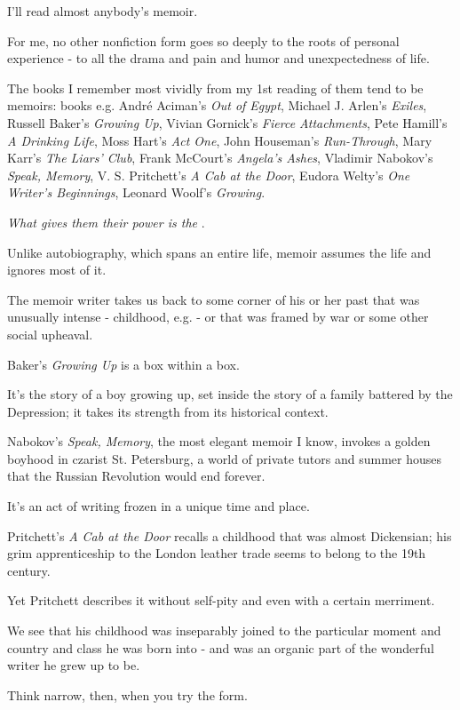 \documentclass{book}
\numberwithin{equation}{section}
\begin{document}
I'll read almost anybody's memoir.

For me, no other nonfiction form goes so deeply to the roots of personal experience - to all the drama and pain and humor and unexpectedness of life.

The books I remember most vividly from my 1st reading of them tend to be memoirs: books e.g. Andr\'e Aciman's \textit{Out of Egypt}, Michael J. Arlen's \textit{Exiles}, Russell Baker's \textit{Growing Up}, Vivian Gornick's \textit{Fierce Attachments}, Pete Hamill's \textit{A Drinking Life}, Moss Hart's \textit{Act One}, John Houseman's \textit{Run-Through}, Mary Karr's \textit{The Liars' Club}, Frank McCourt's \textit{Angela's Ashes}, Vladimir Nabokov's \textit{Speak, Memory}, V. S. Pritchett's \textit{A Cab at the Door}, Eudora Welty's \textit{One Writer's Beginnings}, Leonard Woolf's \textit{Growing}.

%
\textit{What gives them their power is the }.

Unlike autobiography, which spans an entire life, memoir assumes the life and ignores most of it.

The memoir writer takes us back to some corner of his or her past that was unusually intense - childhood, e.g. - or that was framed by war or some other social upheaval.

Baker's \textit{Growing Up} is a box within a box.

It's the story of a boy growing up, set inside the story of a family battered by the Depression; it takes its strength from its historical context.

Nabokov's \textit{Speak, Memory}, the most elegant memoir I know, invokes a golden boyhood in czarist St. Petersburg, a world of private tutors and summer houses that the Russian Revolution would end forever.

It's an act of writing frozen in a unique time and place.

Pritchett's \textit{A Cab at the Door} recalls a childhood that was almost Dickensian; his grim apprenticeship to the London leather trade seems to belong to the 19th century.

Yet Pritchett describes it without self-pity and even with a certain merriment.

We see that his childhood was inseparably joined to the particular moment and country and class he was born into - and was an organic part of the wonderful writer he grew up to be.

%
Think narrow, then, when you try the form.
\end{document}
